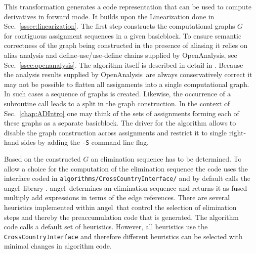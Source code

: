\documentclass{book}
\newcommand{\angel}{angel}
\newcommand{\basicblock}{basicblock}
\newcommand{\OpenAnalysis}{OpenAnalysis}
\newcommand{\code}[1]{{\small\tt{#1}}}
\newcommand{\refsec}[1]{{Sec.~\ref{#1}}}
\begin{document}
This transformation generates a code representation that can be used 
to compute derivatives in forward mode. It builds upon the Linearization
done in \refsec{sssec:linearization}. 
The first step constructs the 
computational graphs $G$ 
for contiguous 
assignment sequences in a given \basicblock. To ensure semantic 
correctness of the graph being constructed in the presence of 
aliasing it relies on alias analysis and define-use/use-define chains 
supplied by \OpenAnalysis, see \refsec{ssec:openanalysis}.
The algorithm itself is described in detail in \cite{Utk04FBB}.
Because the analysis results supplied by \OpenAnalysis\ are always 
conservatively correct it may not be possible to flatten all 
assignments into a single computational graph. In such cases 
a sequence of graphs is created. Likewise, the occurrence 
of a subroutine call leads to a split in the graph construction. 
In the context of \refsec{chap:ADIntro} one may think of the sets of 
assignments forming each of these graphs as a separate \basicblock. 
The driver for the algorithm allows to disable 
the graph construction across assignments and restrict it to 
single right-hand sides by adding the \code{-S} command 
line flag. 

Based on the constructed $G$ an elimination sequence has to be determined.
To allow a choice for the computation of the elimination sequence 
the code uses the interface coded in \code{algorithms/CrossCountryInterface/}
and by default calls the \angel\ library \cite{angelWeb,AGN03,SAGA}.
\angel\ determines an elimination sequence and returns it as 
fused multiply add expressions in terms of the edge references.
There are several heuristics implemented within \angel\ that control 
the selection of elimination steps and thereby the preaccumulation code 
that is generated.  The algorithm code calls a default set of heuristics. 
However, all heuristics use the \code{CrossCountryInterface} and therefore 
different heuristics can be selected with minimal changes in algorithm code.   
\end{document}
